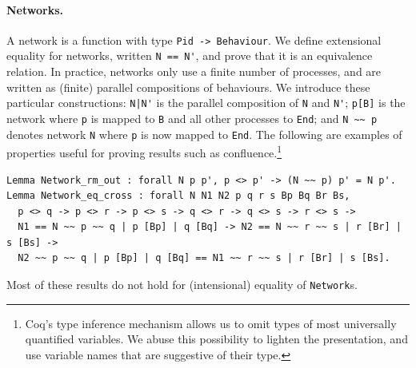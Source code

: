 \documentclass[runningheads]{llncs}
\begin{document}
\paragraph{Networks.}
A network is a function with type \lstinline+Pid -> Behaviour+.
We define extensional equality for networks, written \lstinline+N == N'+, and prove that it is an
equivalence relation.
In practice, networks only use a finite number of processes, and are written as (finite) parallel
compositions of behaviours.
We introduce these particular constructions: \lstinline+N|N'+ is the parallel composition of \lstinline+N+ and \lstinline+N'+; \lstinline+p[B]+ is the network where \lstinline+p+ is mapped to \lstinline+B+ and all other processes to \lstinline+End+; and \lstinline+N ~~ p+ denotes network \lstinline+N+ where \lstinline+p+ is now mapped to \lstinline+End+.
The following are examples of properties useful for proving results such as confluence.\footnote{Coq's type inference mechanism allows us to omit types of most universally quantified variables. We abuse this possibility to lighten the presentation, and use variable names that are suggestive of their type.}
\begin{lstlisting}
Lemma Network_rm_out : forall N p p', p <> p' -> (N ~~ p) p' = N p'.
Lemma Network_eq_cross : forall N N1 N2 p q r s Bp Bq Br Bs,
  p <> q -> p <> r -> p <> s -> q <> r -> q <> s -> r <> s ->
  N1 == N ~~ p ~~ q | p [Bp] | q [Bq] -> N2 == N ~~ r ~~ s | r [Br] | s [Bs] ->
  N2 ~~ p ~~ q | p [Bp] | q [Bq] == N1 ~~ r ~~ s | r [Br] | s [Bs].
\end{lstlisting}
Most of these results do not hold for (intensional) equality of \lstinline+Network+s.
\end{document}

